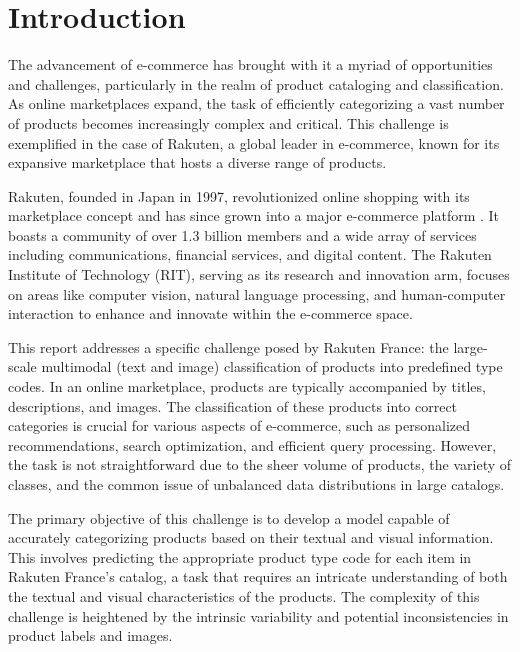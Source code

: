 \section{Introduction}
\label{sec:introduction}

The advancement of e-commerce has brought with it a myriad of opportunities and challenges, particularly in the realm of product cataloging and classification. As online marketplaces expand, the task of efficiently categorizing a vast number of products becomes increasingly complex and critical. This challenge is exemplified in the case of Rakuten, a global leader in e-commerce, known for its expansive marketplace that hosts a diverse range of products.

Rakuten, founded in Japan in 1997, revolutionized online shopping with its marketplace concept and has since grown into a major e-commerce platform \parencite{brian-2022}. It boasts a community of over 1.3 billion members \parencite{statista-2023} and a wide array of services including communications, financial services, and digital content. The Rakuten Institute of Technology (RIT), serving as its research and innovation arm, focuses on areas like computer vision, natural language processing, and human-computer interaction to enhance and innovate within the e-commerce space.

This report addresses a specific challenge posed by Rakuten France: the large-scale multimodal (text and image) classification of products into predefined type codes. In an online marketplace, products are typically accompanied by titles, descriptions, and images. The classification of these products into correct categories is crucial for various aspects of e-commerce, such as personalized recommendations, search optimization, and efficient query processing. However, the task is not straightforward due to the sheer volume of products, the variety of classes, and the common issue of unbalanced data distributions in large catalogs.

The primary objective of this challenge is to develop a model capable of accurately categorizing products based on their textual and visual information. This involves predicting the appropriate product type code for each item in Rakuten France's catalog, a task that requires an intricate understanding of both the textual and visual characteristics of the products. The complexity of this challenge is heightened by the intrinsic variability and potential inconsistencies in product labels and images.

